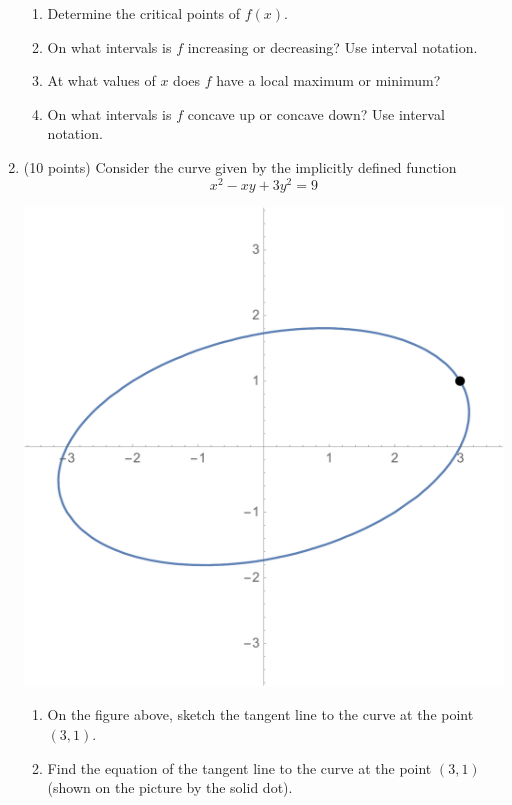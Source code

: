 \documentclass[11pt]{article}
\begin{document}
\begin{enumerate}
\begin{enumerate}
\item Determine the critical points of $f(x).$\\
\vfill
\item On what intervals is $f$ increasing or decreasing? Use interval notation.\\
\vfill
\item At what values of $x$ does $f$ have a local maximum or minimum?\\
\vfill
\item On what intervals is $f$ concave up or concave down? Use interval notation.\\
\vfill
\end{enumerate}
\newpage
\item (10 points) 
Consider the curve given by the implicitly defined function
\[ x^2-x y+3y^2=9 \]

\includegraphics[width=.4\linewidth]{ImpDifPlot}
\begin{enumerate}
\item On the figure above, sketch the tangent line to the curve at the point $(3,1).$\\

\item Find the equation of the tangent line to the curve at the point $(3,1)$ (shown on the picture by the solid dot).\\
\vfill
\end{enumerate}


\end{enumerate}
\end{document}
